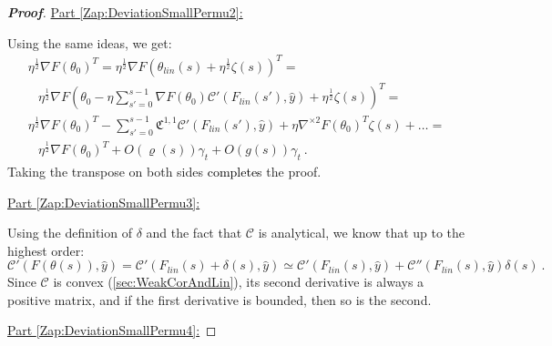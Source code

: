 \documentclass{article} %
\begin{document}
\begin{proof}[\textbf{Proof}]
\underline{Part \ref{Zap:DeviationSmallPermu2}:}

Using the same ideas, we get:
\begin{equation}
\begin{array}{c}
\eta^{\frac{1}{2}}\nabla F\left(\theta_{0}\right)^{T}=\eta^{\frac{1}{2}}\nabla F\left(\theta_{lin}\left(s\right)+\eta^{\frac{1}{2}}\zeta\left(s\right)\right)^{T}=\\
\begin{array}{c}
\\
\\
\end{array}\eta^{\frac{1}{2}}\nabla F\left(\theta_{0}-\eta\sum_{s'=0}^{s-1}\nabla F\left(\theta_{0}\right)\mathcal{C}'\left(F_{lin}\left(s'\right),\hat{y}\right)+\eta^{\frac{1}{2}}\zeta\left(s\right)\right)^{T}=\\
\eta^{\frac{1}{2}}\nabla F\left(\theta_{0}\right)^{T}-\sum_{s'=0}^{s-1}\mathfrak{C}^{1,1}\mathcal{C}'\left(F_{lin}\left(s'\right),\hat{y}\right)+\eta\nabla^{\times2}F\left(\theta_{0}\right)^{T}\zeta\left(s\right)+\ldots=\\
\begin{array}{c}
\\
\\
\end{array}\eta^{\frac{1}{2}}\nabla F\left(\theta_{0}\right)^{T}+O\left(\varrho\left(s\right)\right)\gamma_{t}+O\left(g\left(s\right)\right)\gamma_{t} \ .
\end{array}
\end{equation}
Taking the transpose on both sides \textcolor{black}{completes} the proof.

\underline{Part \ref{Zap:DeviationSmallPermu3}:}

Using the definition of \(\delta\) and the fact that \(\mathcal{C}\) is analytical, we know that up to the highest order:
\begin{equation}
\mathcal{C}'\left(F\left(\theta\left(s\right)\right),\hat{y}\right)=\mathcal{C}'\left(F_{lin}\left(s\right)+\delta\left(s\right),\hat{y}\right)\simeq\mathcal{C}'\left(F_{lin}\left(s\right),\hat{y}\right)+\mathcal{C}''\left(F_{lin}\left(s\right),\hat{y}\right)\delta\left(s\right) \ .
\end{equation}
Since \(\mathcal{C}\) is convex (\ref{sec:WeakCorAndLin}), its second derivative is always a positive matrix, and if the first derivative is bounded, then so is the second.

\underline{Part \ref{Zap:DeviationSmallPermu4}:}


\end{proof}
\end{document}
